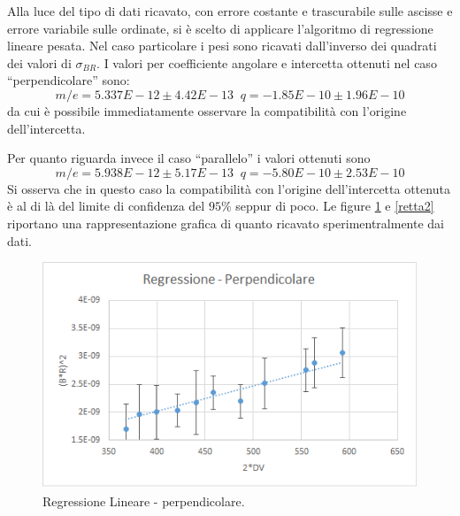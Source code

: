 \documentclass[a4paper,11pt]{article}
\newcommand{\virgolette}[1]{``#1''}
\begin{document}
		Alla luce del tipo di dati ricavato, con errore costante e trascurabile sulle ascisse e errore variabile sulle ordinate, si è scelto di applicare l'algoritmo di regressione lineare pesata. Nel caso particolare i pesi sono ricavati dall'inverso dei quadrati dei valori di $\sigma_{BR}$. I valori per coefficiente angolare e intercetta ottenuti nel caso \virgolette{perpendicolare} sono:
		\begin{equation}\label{mq_perp}
		m/e = 5.337E-12 \pm 4.42E-13 \; \; q= -1.85E-10 \pm 1.96E-10
		\end{equation}
		da cui è possibile immediatamente osservare la compatibilità con l'origine dell'intercetta.
		
		Per quanto riguarda invece il caso \virgolette{parallelo} i valori ottenuti sono
		\begin{equation}\label{mq_parall}
		m/e = 5.938E-12 \pm 5.17E-13 \; \; q= -5.80E-10 \pm 2.53E-10
		\end{equation}
		Si osserva che in questo caso la compatibilità con l'origine dell'intercetta ottenuta è al di là del limite di confidenza del $95\%$ seppur di poco. Le figure \ref{retta1} e \ref{retta2} riportano una rappresentazione grafica di quanto ricavato sperimentralmente dai dati.
		
		\begin{figure}[htpb]
			\centering
			\includegraphics[scale=1.25]{retta1}			%
			\caption{Regressione Lineare - perpendicolare.}\label{retta1}
		\end{figure}	
		
\end{document}
